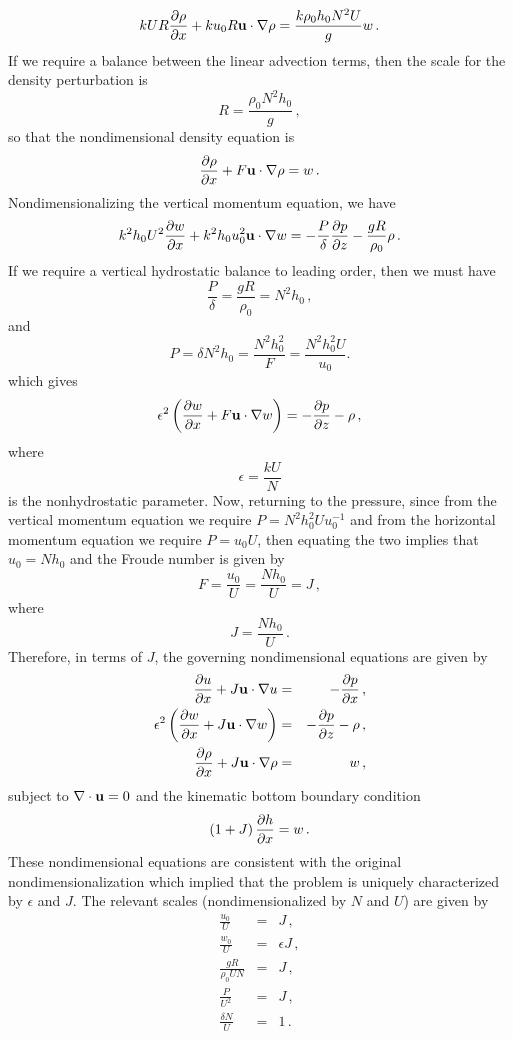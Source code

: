 \documentclass[12pt]{article}
\begin{document}
\[
k U R \frac{\partial{\rho}}{\partial{x}} + k u_0 R \mathbf{u}\cdot\nabla\rho = \frac{k \rho_0 h_0 N^2 U}{g} w\,.
\]
If we require a balance between the linear advection terms, then the scale for the density
perturbation is 
\[
R = \frac{\rho_0 N^2 h_0}{g}\,,
\]
so that the nondimensional density equation is
\[
\frac{\partial{\rho}}{\partial{x}} + F \mathbf{u}\cdot\nabla\rho = w\,.
\]
Nondimensionalizing the vertical momentum equation, we have
\[
k^2 h_0 U^2 \frac{\partial{w}}{\partial{x}} + k^2 h_0 u_0^2\mathbf{u}\cdot\nabla w = -\frac{P}{\delta}\frac{\partial{p}}{\partial{z}} - \frac{g R}{\rho_0} \rho\,.
\]
If we require a vertical hydrostatic balance to leading order, then we must have 
\[
\frac{P}{\delta} = \frac{g R}{\rho_0} 
  = N^2 h_0\,,
\]
and
\[
P = \delta N^2h_0
= \frac{N^2h_0^2}{F}
= \frac{N^2h_0^2U}{u_0}.
\]
which gives
\[
\epsilon^2 \left(\frac{\partial{w}}{\partial{x}} + F\mathbf{u}\cdot\nabla w\right) = -\frac{\partial{p}}{\partial{z}} - \rho\,,
\]
where 
\[
\epsilon = \frac{k U}{N}
\]
is the nonhydrostatic parameter. Now, returning to the pressure, since from the vertical momentum equation we
require $P = N^2h_0^2U u_0^{-1}$ and from the horizontal momentum equation we require $P = u_0 U$, then equating the
two implies that $u_0 = N h_0$ and the Froude number is given by
\[
F = \frac{u_0}{U} = \frac{N h_0}{U} = J\,,
\]
where
\[
J = \frac{N h_0}{U}\,.
\]
Therefore, in terms of $J$, the governing nondimensional equations are given by
\begin{eqnarray*}
\frac{\partial{u}}{\partial{x}} + J\mathbf{u}\cdot\nabla u &=& -\frac{\partial{p}}{\partial{x}}\,,\\
\epsilon^2 \left(\frac{\partial{w}}{\partial{x}} + J\mathbf{u}\cdot\nabla w\right) &=& -\frac{\partial{p}}{\partial{z}} - \rho\,,\\
\frac{\partial{\rho}}{\partial{x}} + J \mathbf{u}\cdot\nabla\rho &=& w\,,
\end{eqnarray*}
subject to $\nabla\cdot\mathbf{u}=0$ and the kinematic bottom boundary condition
\[
\left(1 + J \right)\frac{\partial{h}}{\partial{x}} = w\,.
\]
These nondimensional equations are consistent with the original nondimensionalization which implied
that the problem is uniquely characterized by $\epsilon$ and $J$.
The relevant scales (nondimensionalized by $N$ and $U$) are given by
\begin{eqnarray*}
\frac{u_0}{U} &=& J\,,\\
\frac{w_0}{U} &=& \epsilon J\,,\\
\frac{gR}{\rho_0 U N} &=& J\,,\\
\frac{P}{U^2} &=& J\,,\\
\frac{\delta N}{U} &=& 1\,.
\end{eqnarray*}
\end{document}
